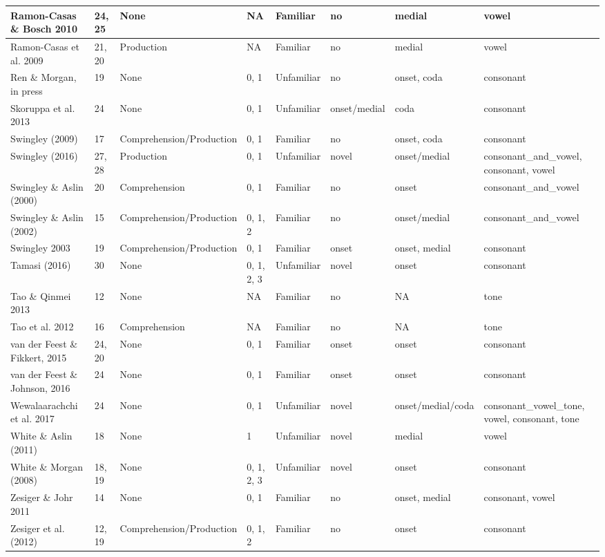 \documentclass[man]{apa6}
\theoremstyle{definition}
\theoremstyle{definition}
\theoremstyle{definition}
\theoremstyle{remark}
\begin{document}
\begin{tabular}{l|l|l|l|l|l|l|l}
\hline
Ramon-Casas \& Bosch 2010 & 24, 25 & None & NA & Familiar & no & medial & vowel\\
\hline
Ramon-Casas et al. 2009 & 21, 20 & Production & NA & Familiar & no & medial & vowel\\
\hline
Ren \& Morgan, in press & 19 & None & 0, 1 & Unfamiliar & no & onset, coda & consonant\\
\hline
Skoruppa et al. 2013 & 24 & None & 0, 1 & Unfamiliar & onset/medial & coda & consonant\\
\hline
Swingley (2009) & 17 & Comprehension/Production & 0, 1 & Familiar & no & onset, coda & consonant\\
\hline
Swingley (2016) & 27, 28 & Production & 0, 1 & Unfamiliar & novel & onset/medial & consonant\_and\_vowel, consonant, vowel\\
\hline
Swingley \& Aslin (2000) & 20 & Comprehension & 0, 1 & Familiar & no & onset & consonant\_and\_vowel\\
\hline
Swingley \& Aslin (2002) & 15 & Comprehension/Production & 0, 1, 2 & Familiar & no & onset/medial & consonant\_and\_vowel\\
\hline
Swingley 2003 & 19 & Comprehension/Production & 0, 1 & Familiar & onset & onset, medial & consonant\\
\hline
Tamasi (2016) & 30 & None & 0, 1, 2, 3 & Unfamiliar & novel & onset & consonant\\
\hline
Tao \& Qinmei 2013 & 12 & None & NA & Familiar & no & NA & tone\\
\hline
Tao et al. 2012 & 16 & Comprehension & NA & Familiar & no & NA & tone\\
\hline
van der Feest \& Fikkert, 2015 & 24, 20 & None & 0, 1 & Familiar & onset & onset & consonant\\
\hline
van der Feest \& Johnson, 2016 & 24 & None & 0, 1 & Familiar & onset & onset & consonant\\
\hline
Wewalaarachchi et al. 2017 & 24 & None & 0, 1 & Unfamiliar & novel & onset/medial/coda & consonant\_vowel\_tone, vowel, consonant, tone\\
\hline
White \& Aslin (2011) & 18 & None & 1 & Unfamiliar & novel & medial & vowel\\
\hline
White \& Morgan (2008) & 18, 19 & None & 0, 1, 2, 3 & Unfamiliar & novel & onset & consonant\\
\hline
Zesiger \& Johr 2011 & 14 & None & 0, 1 & Familiar & no & onset, medial & consonant, vowel\\
\hline
Zesiger et al. (2012) & 12, 19 & Comprehension/Production & 0, 1, 2 & Familiar & no & onset & consonant\\
\hline
\end{tabular}
\end{document}
